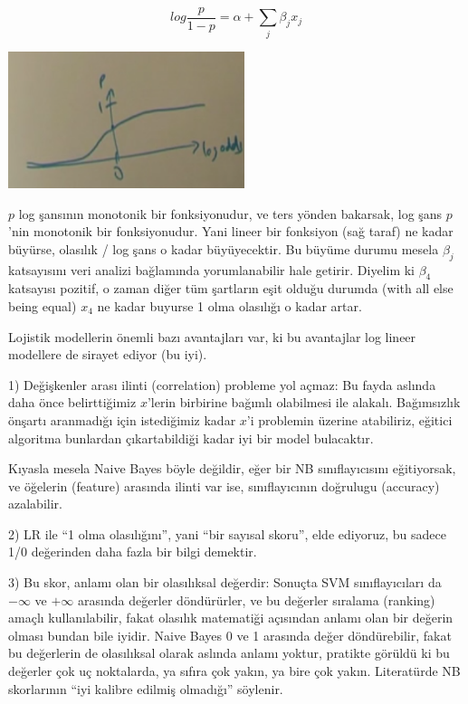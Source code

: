 \documentclass[12pt,fleqn]{article}\usepackage{../../common}
\begin{document}
$$ log \frac{p}{1-p} = \alpha + \sum_j \beta_j x_j $$

\includegraphics[height=4cm]{crf_2.png}

$p$ log şansının monotonik bir fonksiyonudur, ve ters yönden bakarsak, log
şans $p$'nin monotonik bir fonksiyonudur. Yani lineer bir fonksiyon (sağ
taraf) ne kadar büyürse, olasılık / log şans o kadar büyüyecektir. Bu
büyüme durumu mesela $\beta_j$ katsayısını veri analizi bağlamında
yorumlanabilir hale getirir. Diyelim ki $\beta_4$ katsayısı pozitif, o
zaman diğer tüm şartların eşit olduğu durumda (with all else being equal)
$x_4$ ne kadar buyurse 1 olma olasılığı o kadar artar.

Lojistik modellerin önemli bazı avantajları var, ki bu avantajlar log
lineer modellere de sirayet ediyor (bu iyi). 

1) Değişkenler arası ilinti (correlation) probleme yol açmaz: Bu fayda aslında
daha önce belirttiğimiz $x$'lerin birbirine bağımlı olabilmesi ile
alakalı. Bağımsızlık önşartı aranmadığı için istediğimiz kadar $x$'i problemin
üzerine atabiliriz, eğitici algoritma bunlardan çıkartabildiği kadar iyi bir
model bulacaktır.

Kıyasla mesela Naive Bayes böyle değildir, eğer bir NB sınıflayıcısını
eğitiyorsak, ve öğelerin (feature) arasında ilinti var ise, sınıflayıcının
doğrulugu (accuracy) azalabilir.

2) LR ile ``1 olma olasılığını'', yani ``bir sayısal skoru'', elde
ediyoruz, bu sadece 1/0 değerinden daha fazla bir bilgi demektir.

3) Bu skor, anlamı olan bir olasılıksal değerdir: Sonuçta SVM
sınıflayıcıları da $-\infty$ ve $+\infty$ arasında değerler döndürürler, ve
bu değerler sıralama (ranking) amaçlı kullanılabilir, fakat olasılık
matematiği açısından anlamı olan bir değerin olması bundan bile
iyidir. Naive Bayes 0 ve 1 arasında değer döndürebilir, fakat bu değerlerin
de olasılıksal olarak aslında anlamı yoktur, pratikte görüldü ki bu
değerler çok uç noktalarda, ya sıfıra çok yakın, ya bire çok
yakın. Literatürde NB skorlarının ``iyi kalibre edilmiş olmadığı''
söylenir.
\end{document}

